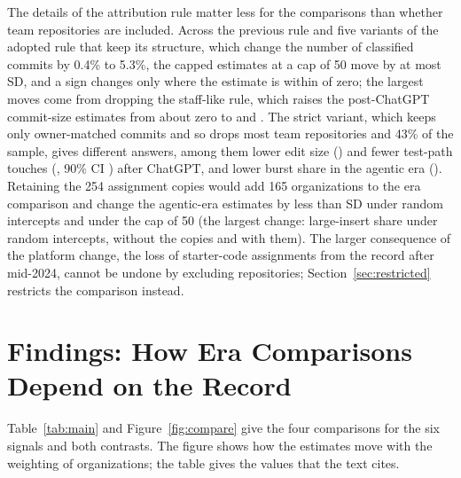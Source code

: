 \documentclass[acmsmall,screen,review,anonymous]{acmart}
\begin{document}
The details of the attribution rule matter less for the comparisons than whether team repositories are included. Across the previous rule and five variants of the adopted rule that keep its structure, which change the number of classified commits by 0.4\% to 5.3\%, the capped estimates at a cap of 50 move by at most  SD, and a sign changes only where the estimate is within  of zero; the largest moves come from dropping the staff-like rule, which raises the post-ChatGPT commit-size estimates from about zero to  and . The strict variant, which keeps only owner-matched commits and so drops most team repositories and 43\% of the sample, gives different answers, among them lower edit size () and fewer test-path touches (, 90\% CI ) after ChatGPT, and lower burst share in the agentic era (). Retaining the 254 assignment copies would add 165 organizations to the era comparison and change the agentic-era estimates by less than  SD under random intercepts and under the cap of 50 (the largest change: large-insert share under random intercepts,  without the copies and  with them). The larger consequence of the platform change, the loss of starter-code assignments from the record after mid-2024, cannot be undone by excluding repositories; Section~\ref{sec:restricted} restricts the comparison instead.

\section{Findings: How Era Comparisons Depend on the Record}
\label{sec:comparisons}

Table~\ref{tab:main} and Figure~\ref{fig:compare} give the four comparisons for the six signals and both contrasts. The figure shows how the estimates move with the weighting of organizations; the table gives the values that the text cites.


\end{document}
